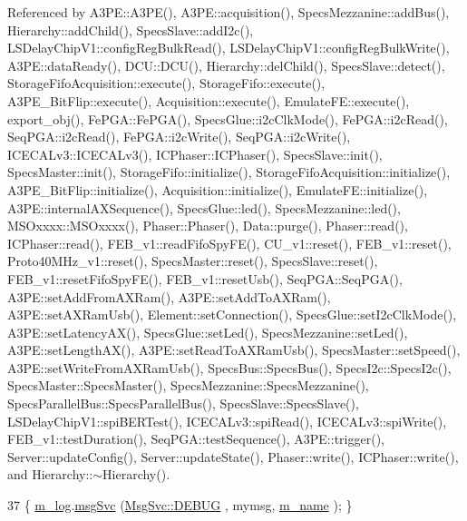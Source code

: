 Referenced by A3\+P\+E\+::\+A3\+P\+E(), A3\+P\+E\+::acquisition(), Specs\+Mezzanine\+::add\+Bus(), Hierarchy\+::add\+Child(), Specs\+Slave\+::add\+I2c(), L\+S\+Delay\+Chip\+V1\+::config\+Reg\+Bulk\+Read(), L\+S\+Delay\+Chip\+V1\+::config\+Reg\+Bulk\+Write(), A3\+P\+E\+::data\+Ready(), D\+C\+U\+::\+D\+C\+U(), Hierarchy\+::del\+Child(), Specs\+Slave\+::detect(), Storage\+Fifo\+Acquisition\+::execute(), Storage\+Fifo\+::execute(), A3\+P\+E\+\_\+\+Bit\+Flip\+::execute(), Acquisition\+::execute(), Emulate\+F\+E\+::execute(), export\+\_\+obj(), Fe\+P\+G\+A\+::\+Fe\+P\+G\+A(), Specs\+Glue\+::i2c\+Clk\+Mode(), Fe\+P\+G\+A\+::i2c\+Read(), Seq\+P\+G\+A\+::i2c\+Read(), Fe\+P\+G\+A\+::i2c\+Write(), Seq\+P\+G\+A\+::i2c\+Write(), I\+C\+E\+C\+A\+Lv3\+::\+I\+C\+E\+C\+A\+Lv3(), I\+C\+Phaser\+::\+I\+C\+Phaser(), Specs\+Slave\+::init(), Specs\+Master\+::init(), Storage\+Fifo\+::initialize(), Storage\+Fifo\+Acquisition\+::initialize(), A3\+P\+E\+\_\+\+Bit\+Flip\+::initialize(), Acquisition\+::initialize(), Emulate\+F\+E\+::initialize(), A3\+P\+E\+::internal\+A\+X\+Sequence(), Specs\+Glue\+::led(), Specs\+Mezzanine\+::led(), M\+S\+Oxxxx\+::\+M\+S\+Oxxxx(), Phaser\+::\+Phaser(), Data\+::purge(), Phaser\+::read(), I\+C\+Phaser\+::read(), F\+E\+B\+\_\+v1\+::read\+Fifo\+Spy\+F\+E(), C\+U\+\_\+v1\+::reset(), F\+E\+B\+\_\+v1\+::reset(), Proto40\+M\+Hz\+\_\+v1\+::reset(), Specs\+Master\+::reset(), Specs\+Slave\+::reset(), F\+E\+B\+\_\+v1\+::reset\+Fifo\+Spy\+F\+E(), F\+E\+B\+\_\+v1\+::reset\+Usb(), Seq\+P\+G\+A\+::\+Seq\+P\+G\+A(), A3\+P\+E\+::set\+Add\+From\+A\+X\+Ram(), A3\+P\+E\+::set\+Add\+To\+A\+X\+Ram(), A3\+P\+E\+::set\+A\+X\+Ram\+Usb(), Element\+::set\+Connection(), Specs\+Glue\+::set\+I2c\+Clk\+Mode(), A3\+P\+E\+::set\+Latency\+A\+X(), Specs\+Glue\+::set\+Led(), Specs\+Mezzanine\+::set\+Led(), A3\+P\+E\+::set\+Length\+A\+X(), A3\+P\+E\+::set\+Read\+To\+A\+X\+Ram\+Usb(), Specs\+Master\+::set\+Speed(), A3\+P\+E\+::set\+Write\+From\+A\+X\+Ram\+Usb(), Specs\+Bus\+::\+Specs\+Bus(), Specs\+I2c\+::\+Specs\+I2c(), Specs\+Master\+::\+Specs\+Master(), Specs\+Mezzanine\+::\+Specs\+Mezzanine(), Specs\+Parallel\+Bus\+::\+Specs\+Parallel\+Bus(), Specs\+Slave\+::\+Specs\+Slave(), L\+S\+Delay\+Chip\+V1\+::spi\+B\+E\+R\+Test(), I\+C\+E\+C\+A\+Lv3\+::spi\+Read(), I\+C\+E\+C\+A\+Lv3\+::spi\+Write(), F\+E\+B\+\_\+v1\+::test\+Duration(), Seq\+P\+G\+A\+::test\+Sequence(), A3\+P\+E\+::trigger(), Server\+::update\+Config(), Server\+::update\+State(), Phaser\+::write(), I\+C\+Phaser\+::write(), and Hierarchy\+::$\sim$\+Hierarchy().


\begin{DoxyCode}
37 \{ \hyperlink{classObject_a0d269813dd7ac1f24bc143031e2963f2}{m\_log}.\hyperlink{classMsgSvc_ad25f18047920cc59a314e5098259711c}{msgSvc} (\hyperlink{classMsgSvc_ae671eb7301996cd049d2da8a65925926a1dbdcc82dce88370ec335883c83b38b0}{MsgSvc::DEBUG}   , mymsg, \hyperlink{classObject_a8b83c95c705d2c3ba0d081fe1710f48d}{m\_name} ); \}
\end{DoxyCode}
\mbox{\label{classObject_a6c9a0397ca804e04d675ed05683f5420}} 
